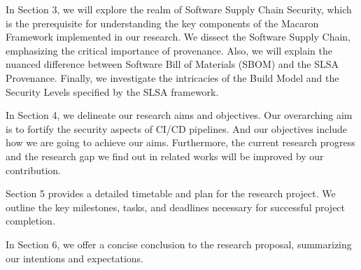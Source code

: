 In Section 3, we will explore the realm of Software Supply Chain Security, which is the prerequisite
for understanding the key components of the Macaron Framework implemented in our research.
We dissect the Software Supply Chain, emphasizing the critical importance of provenance. 
Also, we will explain the nuanced difference between Software Bill of Materials (SBOM) and the SLSA Provenance.
Finally, we investigate the intricacies of the Build Model and the Security Levels specified by the SLSA framework.

In Section 4, we delineate our research aims and objectives. Our overarching aim is to fortify the security aspects of CI/CD pipelines. 
And our objectives include how we are going to achieve our aims. Furthermore, the current research 
progress and the research gap we find out in related works will be improved by our contribution.

Section 5 provides a detailed timetable and plan for the research project. 
We outline the key milestones, tasks, and deadlines necessary for successful project completion.

In Section 6, we offer a concise conclusion to the research proposal, summarizing our intentions and expectations.